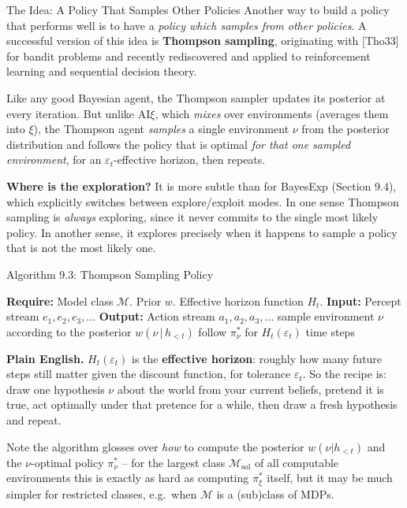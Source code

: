 \documentclass[aspectratio=169,10pt]{beamer}
\begin{document}
\begin{frame}{The Idea: A Policy That Samples Other Policies}
  Another way to build a policy that performs well is to have a
  \emph{policy which samples from other policies}. A successful version of
  this idea is \textbf{Thompson sampling}, originating with [Tho33] for
  bandit problems and recently rediscovered and applied to reinforcement
  learning and sequential decision theory.

  \vspace{0.4em}
  Like any good Bayesian agent, the Thompson sampler updates its posterior
  at every iteration. But unlike $\mathrm{AI}\xi$, which \emph{mixes} over
  environments (averages them into $\xi$), the Thompson agent \emph{samples}
  a single environment $\nu$ from the posterior distribution and follows
  the policy that is optimal \emph{for that one sampled environment}, for
  an $\varepsilon_t$-effective horizon, then repeats.

  \vspace{0.4em}
  \textbf{Where is the exploration?} It is more subtle than for BayesExp
  (Section 9.4), which explicitly switches between explore/exploit modes.
  In one sense Thompson sampling is \emph{always} exploring, since it never
  commits to the single most likely policy. In another sense, it explores
  precisely when it happens to sample a policy that is not the most likely
  one.
\end{frame}

\begin{frame}{Algorithm 9.3: Thompson Sampling Policy}
  \begin{algorithmic}[1]
    \Statex \textbf{Require:} Model class $\mathcal{M}$. Prior $w$. Effective horizon function $H_t$.
    \Statex \textbf{Input:} Percept stream $e_1,e_2,e_3,\dots$
    \Statex \textbf{Output:} Action stream $a_1,a_2,a_3,\dots$
      \State sample environment $\nu$ according to the posterior $w(\nu\,|\,h_{<t})$
      \State follow $\pi^*_\nu$ for $H_t(\varepsilon_t)$ time steps
    \EndWhile
  \end{algorithmic}
  \textbf{Plain English.} $H_t(\varepsilon_t)$ is the \textbf{effective
  horizon}: roughly how many future steps still matter given the discount
  function, for tolerance $\varepsilon_t$. So the recipe is: draw one
  hypothesis $\nu$ about the world from your current beliefs, pretend it is
  true, act optimally under that pretence for a while, then draw a fresh
  hypothesis and repeat.

  \vspace{0.4em}
  Note the algorithm glosses over \emph{how} to compute the posterior
  $w(\nu|h_{<t})$ and the $\nu$-optimal policy $\pi^*_\nu$ -- for the
  largest class $\mathcal{M}_{\mathrm{sol}}$ of all computable environments
  this is exactly as hard as computing $\pi^*_\xi$ itself, but it may be
  much simpler for restricted classes, e.g.\ when $\mathcal{M}$ is a
  (sub)class of MDPs.
\end{frame}
\end{document}
